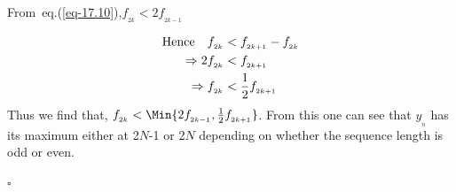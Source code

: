 \begin{multicols}{2}
\textup{From~eq.(\ref{eq-17.10})},\quad $f_{_{2k}} < 2f_{_{2k-1}}$

\vspace{-.6cm}

\begin{align}
\textup{Hence}\quad f_{_{2k}} &< f_{_{2k+1}} - f_{_{2k}} \nonumber\\
\Rightarrow 2f_{_{2k}} &< f_{_{2k+1}}\nonumber\\
\Rightarrow f_{_{2k}} &< \frac{1}{2}f_{_{2k+1}}\label{eq-17.12}
\end{align}
Thus we find that, $f_{_{2k}} < \Min\{2f_{_{2k-1}}, \frac{1}{2}f_{_{2k+1}}\}$. From this one can see that $y_{_n}$ has its maximum either at 2$N$-1 or 2$N$ depending on whether the sequence length is odd or even.

\hfill{$\square$}

\vspace{-.6cm}


\end{multicols}
